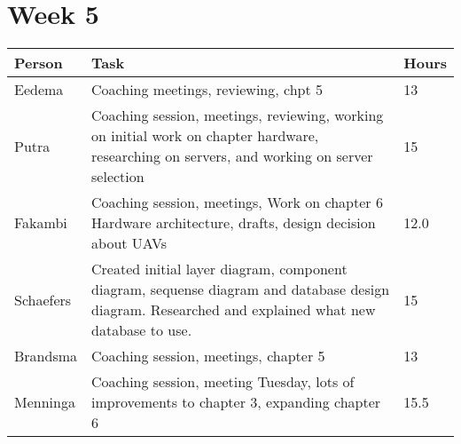 \section{Week 5}
\begin{tabular}{p{} p{} p{}}
	\textbf{Person} & \textbf{Task}                                                                                                                                      & \textbf{Hours} \\ \midrule
	Eedema          & Coaching meetings, reviewing, chpt 5                                                                                                               & 13             \\ \midrule
	Putra           & Coaching session, meetings, reviewing, working on initial work on chapter hardware, researching on servers, and working on server selection        & 15             \\ \midrule
	Fakambi         & Coaching session, meetings, Work on chapter 6 Hardware architecture, drafts, design decision about UAVs                                            & 12.0           \\ \midrule
	Schaefers       & Created initial layer diagram, component diagram, sequense diagram and database design diagram. Researched and explained what new database to use. & 15             \\ \midrule
	Brandsma        & Coaching session, meetings, chapter 5                                                                                                              & 13             \\ \midrule
	Menninga        & Coaching session, meeting Tuesday, lots of improvements to chapter 3, expanding chapter 6                                                          & 15.5           \\ \midrule
\end{tabular}

